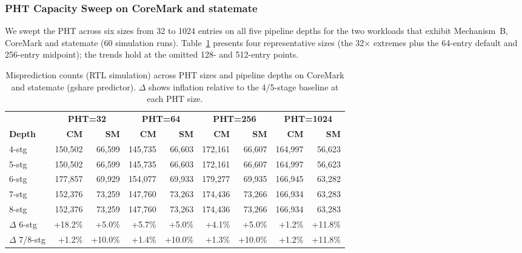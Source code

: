 \documentclass[acmsmall,nonacm,screen]{acmart}
\begin{document}
\subsubsection{PHT Capacity Sweep on CoreMark and statemate}
\label{sec:predsweep}

We swept the PHT across six sizes from 32 to 1024 entries on all five pipeline depths for the two workloads that exhibit Mechanism~B, CoreMark and statemate (60 simulation runs).
Table~\ref{tab:phtsweep} presents four representative sizes (the 32$\times$ extremes plus the 64-entry default and 256-entry midpoint); the trends hold at the omitted 128- and 512-entry points.

\begin{table}[t]
\centering
\caption{Misprediction counts (RTL simulation) across PHT sizes and pipeline depths on CoreMark and statemate (gshare predictor). $\Delta$ shows inflation relative to the 4/5-stage baseline at each PHT size.}
\label{tab:phtsweep}
\small
\begin{tabular}{@{}l rr rr rr rr@{}}
\toprule
& \multicolumn{2}{c}{\textbf{PHT=32}} & \multicolumn{2}{c}{\textbf{PHT=64}} & \multicolumn{2}{c}{\textbf{PHT=256}} & \multicolumn{2}{c}{\textbf{PHT=1024}} \\
\cmidrule(lr){2-3} \cmidrule(lr){4-5} \cmidrule(lr){6-7} \cmidrule(lr){8-9}
\textbf{Depth} & \textbf{CM} & \textbf{SM} & \textbf{CM} & \textbf{SM} & \textbf{CM} & \textbf{SM} & \textbf{CM} & \textbf{SM} \\
\midrule
4-stg & 150{,}502 & 66{,}599 & 145{,}735 & 66{,}603 & 172{,}161 & 66{,}607 & 164{,}997 & 56{,}623 \\
5-stg & 150{,}502 & 66{,}599 & 145{,}735 & 66{,}603 & 172{,}161 & 66{,}607 & 164{,}997 & 56{,}623 \\
6-stg & 177{,}857 & 69{,}929 & 154{,}077 & 69{,}933 & 179{,}277 & 69{,}935 & 166{,}945 & 63{,}282 \\
7-stg & 152{,}376 & 73{,}259 & 147{,}760 & 73{,}263 & 174{,}436 & 73{,}266 & 166{,}934 & 63{,}283 \\
8-stg & 152{,}376 & 73{,}259 & 147{,}760 & 73{,}263 & 174{,}436 & 73{,}266 & 166{,}934 & 63{,}283 \\
\midrule
$\Delta$ 6-stg & +18.2\% & +5.0\% & +5.7\% & +5.0\% & +4.1\% & +5.0\% & +1.2\% & +11.8\% \\
$\Delta$ 7/8-stg & +1.2\% & +10.0\% & +1.4\% & +10.0\% & +1.3\% & +10.0\% & +1.2\% & +11.8\% \\
\bottomrule
\end{tabular}
\end{table}
\end{document}
